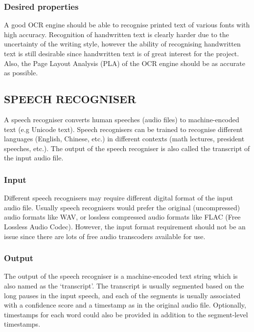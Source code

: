\documentclass[12pt]{article}
\begin{document}
\subsubsection{Desired properties}

A good OCR engine should be able to recognise printed text of various fonts with high accuracy. Recognition of handwritten text is clearly harder due to the uncertainty of the writing style, however the ability of recognising handwritten text is still desirable since handwritten text is of great interest for the project. Also, the Page Layout Analysis (PLA) of the OCR engine should be as accurate as possible.

\subsection{SPEECH RECOGNISER}

A speech recogniser converts human speeches (audio files) to machine-encoded text (e.g Unicode text). Speech recognisers can be trained to recognise different languages (English, Chinese, etc.) in different contexts (math lectures, president speeches, etc.). The output of the speech recogniser is also called the transcript of the input audio file.

\subsubsection{Input}

Different speech recognisers may require different digital format of the input audio file. Usually speech recognisers would prefer the original (uncompressed) audio formats like WAV, or lossless compressed audio formats like FLAC (Free Lossless Audio Codec). However, the input format requirement should not be an issue since there are lots of free audio transcoders available for use.

\subsubsection{Output}

The output of the speech recogniser is a machine-encoded text string which is also named as the `transcript'. The transcript is usually segmented based on the long pauses in the input speech, and each of the segments is usually associated with a confidence score and a timestamp as in the original audio file. Optionally, timestamps for each word could also be provided in addition to the segment-level timestamps.
\end{document}
